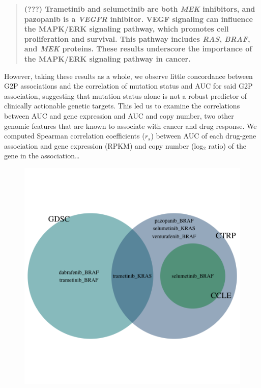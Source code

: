 \documentclass[man,floatsintext]{apa6}
\begin{document}
\begin{quote}
\textbf{(???) Trametinib and selumetinib are both \emph{MEK} inhibitors,
and pazopanib is a \emph{VEGFR} inhibitor. VEGF signaling can influence
the MAPK/ERK signaling pathway, which promotes cell proliferation and
survival. This pathway includes \emph{RAS}, \emph{BRAF}, and \emph{MEK}
proteins. These results underscore the importance of the MAPK/ERK
signaling pathway in cancer.}
\end{quote}

However, taking these results as a whole, we observe little concordance
between G2P associations and the correlation of mutation status and AUC
for said G2P association, suggesting that mutation status alone is not a
robust predictor of clinically actionable genetic targets. This led us
to examine the correlations between AUC and gene expression and AUC and
copy number, two other genomic features that are known to associate with
cancer and drug response. We computed Spearman correlation coefficients
(\(r_s\)) between AUC of each drug-gene association and gene expression
(RPKM) and copy number (log\(_2\) ratio) of the gene in the
association\ldots{}

\begin{figure}
\centering
\includegraphics{./plots/manuscript/drugscreen_venn.png}
\caption{}
\end{figure}
\end{document}
